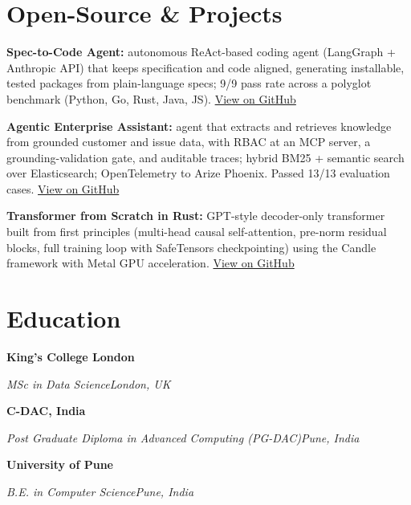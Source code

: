 \documentclass[10pt,a4paper]{article}
\newcommand{\entry}[4]{%
  {\color{company}\bfseries #1}\hfill {\color{muted}#2}\par
  \vspace{1pt}
  {\itshape #3}\hfill {\color{muted}\itshape #4}\par
  \vspace{3pt}%
}
\begin{document}
\section{Open-Source \& Projects}
\begin{tight}
  \item \textbf{Spec-to-Code Agent:} autonomous ReAct-based coding agent (LangGraph + Anthropic API) that keeps specification and code aligned, generating installable, tested packages from plain-language specs; 9/9 pass rate across a polyglot benchmark (Python, Go, Rust, Java, JS). \href{https://github.com/abhijeetscode/Spec-to-Code-Agent}{View on GitHub}
  \item \textbf{Agentic Enterprise Assistant:} agent that extracts and retrieves knowledge from grounded customer and issue data, with RBAC at an MCP server, a grounding-validation gate, and auditable traces; hybrid BM25 + semantic search over Elasticsearch; OpenTelemetry to Arize Phoenix. Passed 13/13 evaluation cases. \href{https://github.com/abhijeetscode/Agentic-Enterprise-Assistant}{View on GitHub}
  \item \textbf{Transformer from Scratch in Rust:} GPT-style decoder-only transformer built from first principles (multi-head causal self-attention, pre-norm residual blocks, full training loop with SafeTensors checkpointing) using the Candle framework with Metal GPU acceleration. \href{https://github.com/abhijeetscode/transformer-rust}{View on GitHub}
\end{tight}

\section{Education}
\entry{King's College London}{}{MSc in Data Science}{London, UK}
\vspace{-3pt}
\entry{C-DAC, India}{}{Post Graduate Diploma in Advanced Computing (PG-DAC)}{Pune, India}
\vspace{-3pt}
\entry{University of Pune}{}{B.E. in Computer Science}{Pune, India}
\end{document}
